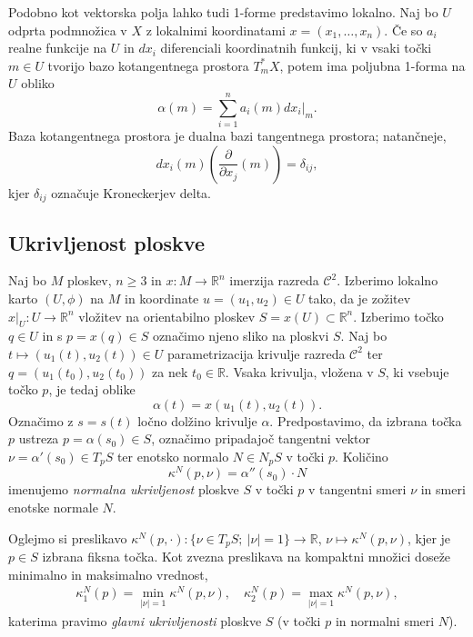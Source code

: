 \documentclass[12pt,a4paper,twoside]{article}
\theoremstyle{definition} %
\theoremstyle{plain} %
\numberwithin{equation}{section}  %
\newcommand{\R}{\mathbb R}
\begin{document}
Podobno kot vektorska polja lahko tudi 1-forme predstavimo lokalno. Naj bo $U$ odprta podmnožica v $X$ z lokalnimi koordinatami $x = (x_{1}, \dots, x_{n})$. Če so $a_{i}$ realne funkcije na $U$ in $dx_{i}$ diferenciali koordinatnih funkcij, ki v vsaki točki $m \in U$ tvorijo bazo kotangentnega prostora $T_{m}^{*}X$, potem ima poljubna 1-forma na $U$ obliko
\begin{equation}
\alpha (m) = \sum_{i=1}^{n} a_{i}(m) dx_{i} \big|_{m}.
\end{equation}
Baza kotangentnega prostora je dualna bazi tangentnega prostora; natančneje, 
\begin{equation*}
dx_{i}(m) \left(\frac{\partial}{\partial x_{j}} (m) \right) = \delta _{ij},
\end{equation*}
kjer $\delta_{ij}$ označuje Kroneckerjev delta.

\subsection{Ukrivljenost ploskve}
%
Naj bo $M$ ploskev, $n \geq 3$ in $x \colon M \to \R^{n}$ imerzija razreda $\mathcal{C}^2$. Izberimo lokalno karto $(U, \phi)$ na $M$ in koordinate $u = (u_1, u_2) \in U$ tako, da je zožitev $x|_{U} \colon U \to \R^{n}$ vložitev na orientabilno ploskev $S = x(U) \subset \R^{n}$. Izberimo točko $q \in U$ in s $p = x(q) \in S$ označimo njeno sliko na ploskvi $S$. Naj bo $t \mapsto (u_1(t), u_2(t)) \in U$ parametrizacija krivulje razreda $\mathcal{C}^2$ ter $q = (u_1(t_0), u_2(t_0))$ za nek $t_0 \in \mathbb{R}$. Vsaka krivulja, vložena v $S$, ki vsebuje točko $p$, je tedaj oblike
\begin{equation}
\alpha (t) = x(u_1(t), u_2(t)).
\end{equation}
Označimo z $s = s(t)$ ločno dolžino krivulje $\alpha$. Predpostavimo, da izbrana točka $p$ ustreza $p = \alpha(s_0) \in S$, označimo pripadajoč tangentni vektor $\nu = \alpha '(s_0) \in T_{p}S$ ter enotsko normalo $N \in N_{p}S$ v točki $p$. Količino
\begin{equation}
\kappa ^{N}(p, \nu) = \alpha ''(s_0) \cdot N
\end{equation}
imenujemo \emph{normalna ukrivljenost} ploskve $S$ v točki $p$ v tangentni smeri $\nu$ in smeri enotske normale $N$.

Oglejmo si preslikavo $ \kappa ^{N}(p, \cdot) \colon \{\nu \in T_{p}S ; \ |\nu|=1 \} \to \R$, $ \nu \mapsto \kappa ^{N}(p, \nu)$, kjer je $p \in S$ izbrana fiksna točka. Kot zvezna preslikava na kompaktni množici doseže minimalno in maksimalno vrednost,
\begin{gather} 
\kappa _{1}^{N}(p) = \min _{|\nu| = 1} \kappa ^{N}(p, \nu), \quad \kappa _{2}^{N}(p) = \max _{|\nu| = 1} \kappa ^{N}(p, \nu),
\end{gather}
katerima pravimo \emph{glavni ukrivljenosti} ploskve $S$ (v točki $p$ in normalni smeri $N$).
\end{document}
